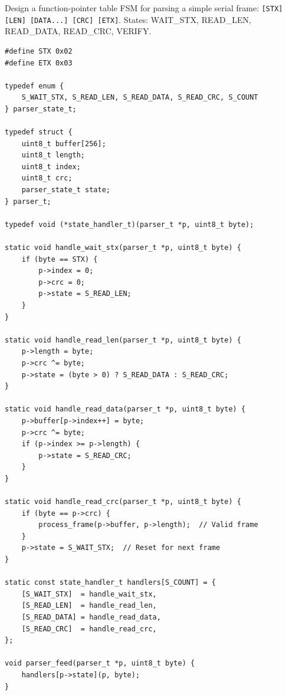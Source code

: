 \begin{example}
Design a function-pointer table FSM for parsing a simple serial frame: \texttt{[STX] [LEN] [DATA...] [CRC] [ETX]}. States: WAIT\_STX, READ\_LEN, READ\_DATA, READ\_CRC, VERIFY.

\begin{solution}
\begin{lstlisting}[style=C, caption={Table-driven FSM for serial frame parser.}]
#define STX 0x02
#define ETX 0x03

typedef enum {
    S_WAIT_STX, S_READ_LEN, S_READ_DATA, S_READ_CRC, S_COUNT
} parser_state_t;

typedef struct {
    uint8_t buffer[256];
    uint8_t length;
    uint8_t index;
    uint8_t crc;
    parser_state_t state;
} parser_t;

typedef void (*state_handler_t)(parser_t *p, uint8_t byte);

static void handle_wait_stx(parser_t *p, uint8_t byte) {
    if (byte == STX) {
        p->index = 0;
        p->crc = 0;
        p->state = S_READ_LEN;
    }
}

static void handle_read_len(parser_t *p, uint8_t byte) {
    p->length = byte;
    p->crc ^= byte;
    p->state = (byte > 0) ? S_READ_DATA : S_READ_CRC;
}

static void handle_read_data(parser_t *p, uint8_t byte) {
    p->buffer[p->index++] = byte;
    p->crc ^= byte;
    if (p->index >= p->length) {
        p->state = S_READ_CRC;
    }
}

static void handle_read_crc(parser_t *p, uint8_t byte) {
    if (byte == p->crc) {
        process_frame(p->buffer, p->length);  // Valid frame
    }
    p->state = S_WAIT_STX;  // Reset for next frame
}

static const state_handler_t handlers[S_COUNT] = {
    [S_WAIT_STX]  = handle_wait_stx,
    [S_READ_LEN]  = handle_read_len,
    [S_READ_DATA] = handle_read_data,
    [S_READ_CRC]  = handle_read_crc,
};

void parser_feed(parser_t *p, uint8_t byte) {
    handlers[p->state](p, byte);
}
\end{lstlisting}
\end{solution}
\end{example}

